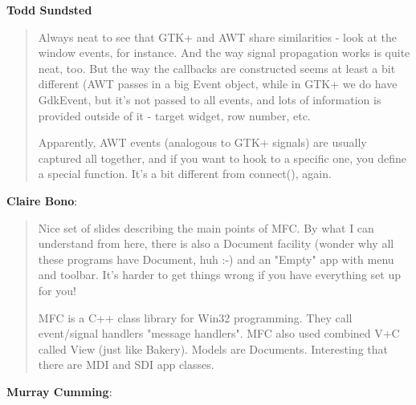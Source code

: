 \documentclass[a4paper]{howto}
\begin{document}
{\bf Todd Sundsted}

\begin{quotation}

    Always neat to see that GTK+ and AWT share similarities - look at
    the window events, for instance. And the way signal propagation
    works is quite neat, too. But the way the callbacks are constructed
    seems at least a bit different (AWT passes in a big Event object,
    while in GTK+ we do have GdkEvent, but it's not passed to all events,
    and lots of information is provided outside of it - target widget,
    row number, etc.

    Apparently, AWT events (analogous to GTK+ signals) are usually
    captured all together, and if you want to hook to a specific one,
    you define a special function. It's a bit different from connect(),
    again.

\end{quotation}

{\bf Claire Bono}:

\begin{quotation}

    Nice set of slides describing the main points of MFC. By what I can
    understand from here, there is also a Document facility (wonder why
    all these programs have Document, huh :-) and an "Empty" app with
    menu and toolbar. It's harder to get things wrong if you have
    everything set up for you!

    MFC is a C++ class library for Win32 programming. They call
    event/signal handlers "message handlers". MFC also used combined V+C
    called View (just like Bakery). Models are Documents. Interesting
    that there are MDI and SDI app classes.

\end{quotation}

{\bf Murray Cumming}:
\end{document}
